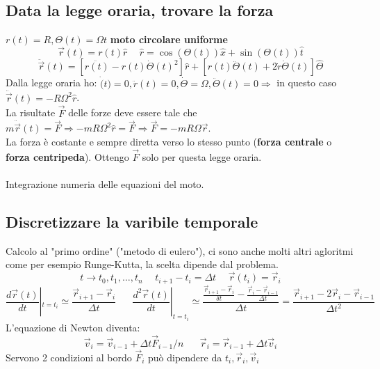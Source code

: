 \subsection{Data la legge oraria, trovare la forza}
$r(t) = R, \Theta(t) = \Omega t$ \textbf{moto circolare uniforme}
$$\vec{r}(t) = r(t)\hat{r}\hspace{15pt}\hat{r} = \cos(\Theta(t))\hat{x} + \sin(\Theta(t))\hat{t}$$
$$\ddot{\vec{r}} (t) = [\ddot{r(t)} - r(t)\dot{\Theta}(t)^2]\hat{r} + [r(t)\ddot{\Theta}(t) + 2\dot{r}\dot{\Theta}(t)]\hat{\Theta}$$
Dalla legge oraria ho: $\dot(t) = 0, \ddot{r}(t) = 0, \dot{\Theta} = \Omega, \ddot{\Theta}(t) = 0 \Rightarrow$ in questo caso $\ddot{\vec{r}}(t) = -R\Omega^2\hat{r}$.\\
La risultate $\vec{F}$ delle forze deve essere tale che $m\ddot{\vec{r}}(t) = \vec{F} \Rightarrow -mR\Omega^2\hat{r} = \vec{F} \Rightarrow \vec{F} = -mR\Omega\vec{r}$.\\
La forza è costante e sempre diretta verso lo stesso punto (\textbf{forza centrale} o  \textbf{forza centripeda}). Ottengo $\vec{F}$ solo per questa legge oraria.\\\\
Integrazione numeria delle equazioni del moto.

\subsection{Discretizzare la varibile temporale}
Calcolo al "primo ordine" ("metodo di eulero"), ci sono anche molti altri agloritmi come per esempio Runge-Kutta, la scelta
dipende dal problema.
$$t \to t_0, t_1, \dots, t_n \hspace{15pt} t_{i+1} - t_i = \Delta t \hspace{15pt}\vec{r}(t_i) = \vec{r}_i$$
$$\frac{d\vec{r}(t)}{dt}|_{t=t_i} \simeq \frac{\vec{r}_{i+1} - \vec{r}_i}{\Delta t} \hspace{20pt}\frac{d^2\vec{r}(t)}{dt}|_{t = t_i} \simeq \frac{\frac{\vec{r}_{i+1} - \vec{r}_i}{\delta t} - \frac{\vec{r}_i - \vec{r}_{i-1}}{\Delta t}}{\Delta t} = \frac{\vec{r}_{i+1} - 2 \vec{r}_i - \vec{r}_{i-1}}{\Delta t^2}$$
L'equazione di Newton diventa:
$$\vec{v}_i = \vec{v}_{i-1} + \Delta t \vec{F}_{i-1} / n \hspace{20pt}\vec{r}_i = \vec{r}_{i-1} + \Delta t \vec{v}_i$$
Servono 2 condizioni al bordo $\vec{F}_i$ può dipendere da $t_i, \vec{r}_i, \vec{v}_i$

\newpage
